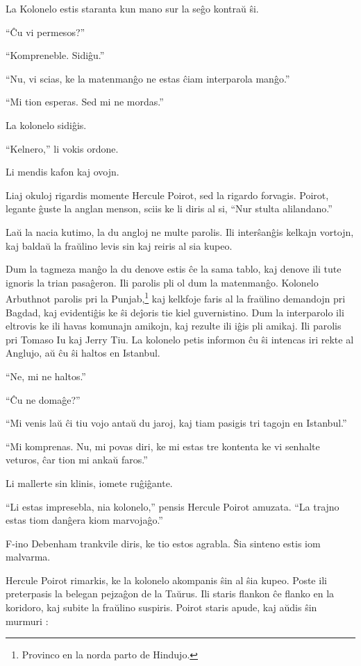 La Kolonelo estis staranta kun mano sur la seĝo kontraŭ ŝi.

``Ĉu vi permesos?''

``Kompreneble. Sidiĝu.''

``Nu, vi scias, ke la matenmanĝo ne estas ĉiam interparola manĝo.''

``Mi tion esperas. Sed mi ne mordas.''

La kolonelo sidiĝis.

``Kelnero,'' li vokis ordone.

Li mendis kafon kaj ovojn.

Liaj okuloj rigardis momente Hercule Poirot, sed la rigardo forvagis. Poirot, legante ĝuste la anglan menson, sciis ke li diris al si, ``Nur stulta alilandano.''

Laŭ la nacia kutimo, la du angloj ne multe parolis. Ili interŝanĝis kelkajn vortojn, kaj baldaŭ la fraŭlino levis sin kaj reiris al sia kupeo.

Dum la tagmeza manĝo la du denove estis ĉe la sama tablo, kaj denove ili tute ignoris la trian pasaĝeron. Ili parolis pli ol dum la matenmanĝo. Kolonelo Arbuthnot parolis pri la Punjab,\footnote{Provinco en la norda parto de Hindujo.} kaj kelkfoje faris al la fraŭlino demandojn pri Bagdad, kaj evidentiĝis ke ŝi deĵoris tie kiel guvernistino. Dum la interparolo ili eltrovis ke ili havas komunajn amikojn, kaj rezulte ili iĝis pli amikaj. Ili parolis pri Tomaso Iu kaj Jerry Tiu. La kolonelo petis informon ĉu ŝi intencas iri rekte al Anglujo, aŭ ĉu ŝi haltos en Istanbul.

``Ne, mi ne haltos.''

``Ĉu ne domaĝe?''

``Mi venis laŭ ĉi tiu vojo antaŭ du jaroj, kaj tiam pasigis tri tagojn en Istanbul.''

``Mi komprenas. Nu, mi povas diri, ke mi estas tre kontenta ke vi senhalte veturos, ĉar tion mi ankaŭ faros.''

Li mallerte sin klinis, iomete ruĝiĝante.

``Li estas impresebla, nia kolonelo,'' pensis Hercule Poirot amuzata. ``La trajno estas tiom danĝera kiom marvojaĝo.''

F-ino Debenham trankvile diris, ke tio estos agrabla. Ŝia sinteno estis iom malvarma.

Hercule Poirot rimarkis, ke la kolonelo akompanis ŝin al ŝia kupeo. Poste ili preterpasis la belegan pejzaĝon de la Taŭrus. Ili staris flankon ĉe flanko en la koridoro, kaj subite la fraŭlino suspiris. Poirot staris apude, kaj aŭdis ŝin murmuri :

